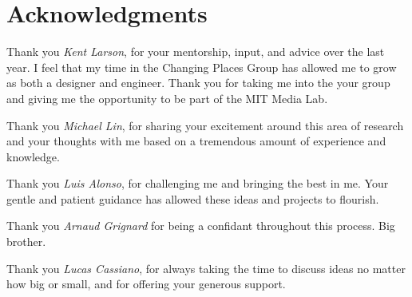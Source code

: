 \begin{abstractpage}


\end{abstractpage}
% 

\cleardoublepage

%
%
%
%
%

\justify
\section*{Acknowledgments}

Thank you \textit{Kent Larson}, for your mentorship, input, and advice over the last year. I feel that my time in the Changing Places Group has allowed me to grow as both a designer and engineer. Thank you for taking me into the your group and giving me the opportunity to be part of the MIT Media Lab.

Thank you \textit{Michael Lin}, for sharing your excitement around this area of research and your thoughts with me based on a tremendous amount of experience and knowledge.

Thank you \textit{Luis Alonso}, for challenging me and bringing the best in me. \newline Your gentle and patient guidance has allowed these ideas and projects to flourish.

Thank you \textit{Arnaud Grignard} for being a confidant throughout this process. Big brother.

Thank you \textit{Lucas Cassiano}, for always taking the time to discuss ideas no matter how big or small, and for offering your generous support.

